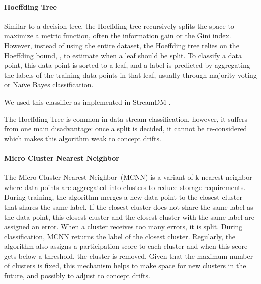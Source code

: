 \paragraph{Hoeffding Tree~\cite{VFDT}}
Similar to a decision tree, the Hoeffding tree recursively splits the space to maximize a
metric function, often the
information gain or the Gini index. However,
instead of using the entire dataset, the Hoeffding
tree relies on the Hoeffding bound, , to estimate
when a leaf should be split. To classify a
data point, this data point is sorted to a leaf,
and a label is predicted by aggregating the labels of the training data points in that leaf, usually through
majority voting or Naïve Bayes classification.

We used this classifier as implemented in StreamDM .

The Hoeffding Tree is common in data stream
classification, however, it suffers from one main
disadvantage: once a split is decided, it cannot
be re-considered which makes this algorithm weak
to concept drifts.

\paragraph{Micro Cluster Nearest Neighbor~\cite{mc-nn}}
The Micro Cluster Nearest Neighbor~(MCNN) is a
variant of k-nearest neighbor where data points are
aggregated into clusters to reduce storage requirements.  During training, the
algorithm merges a new data point to the closest
cluster that shares the same label. If the closest
cluster does not share the same label as the data
point, this closest cluster and the closest
cluster with the same label are assigned an error. When a cluster receives too
many errors, it is split. During classification,
MCNN returns the label of the closest cluster.
Regularly, the algorithm also assigns a
participation score to each cluster and when this
score gets below a threshold, the cluster is
removed. Given that the maximum number of clusters
is fixed, this mechanism helps to make space for
new clusters in the future, and possibly to adjust to concept drifts.  


